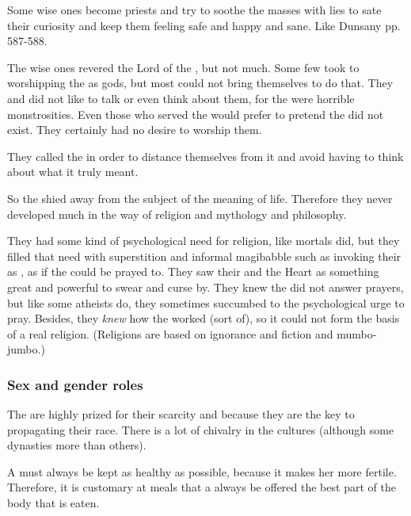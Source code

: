 Some wise ones become priests and try to soothe the masses with lies to sate their curiosity and keep them feeling safe and happy and sane. Like Dunsany pp. 587-588. 

The wise ones revered the Lord of the \SitraAchra, but not much.
Some few took to worshipping the \SitraAchras as gods, but most could not bring themselves to do that.
They  and did not like to talk or even think about them, for the \banes were horrible monstrosities.
Even those who served the \banelords would prefer to pretend the \banelords did not exist.
They certainly had no desire to worship them.

They called the \SitraAchra {} in order to distance themselves from it and avoid having to think about what it truly meant. 

So the \resphain shied away from the subject of the meaning of life.
Therefore they never developed much in the way of religion and mythology and philosophy.

They had some kind of psychological need for religion, like mortals did, but they filled that need with superstition and informal magibabble such as invoking their \matrices as , as if the \matrices could be prayed to.
They saw their \matrices and the Heart as something great and powerful to swear and curse by. 
They knew the \matrices did not answer prayers, but like some atheists do, they sometimes succumbed to the psychological urge to pray.
Besides, they \emph{knew} how the \matrices worked (sort of), so it could not form the basis of a real religion. 
(Religions are based on ignorance and fiction and mumbo-jumbo.)







\subsubsection{Sex and gender roles}
The \resviel{} are highly prized for their scarcity and because they are the key to propagating their race. 
There is a lot of chivalry in the \resphan{} cultures (although some dynasties more than others). 

A \resvil{} must always be kept as healthy as possible, because it makes her more fertile. 
Therefore, it is customary at meals that a \resvil{} always be offered the best part of the body that is eaten. 

